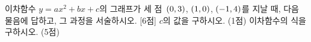 이차함수 $y=ax^2+bx+c$의 그래프가 세 점~$(0{,}\mkern3mu 3)$, $(1{,}\mkern3mu 0)$, $(-1{,}\mkern3mu 4)$를 지날 때, 다음 물음에 답하고, 그 과정을 서술하시오.  \mbox{[6점]}
 $c$의 값을 구하시오. (1점)
 이차함수의 식을 구하시오. (5점)
